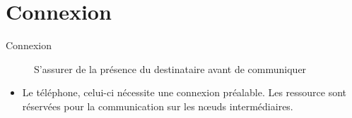 	\section{Connexion}
	\begin{description}
		\item[Connexion] S'assurer de la présence du destinataire avant de communiquer
	\end{description}
	\begin{exemple}
		\begin{itemize}
			\item Le téléphone, celui-ci nécessite une connexion préalable. Les ressource sont réservées pour la communication sur les n\oe{}uds
				intermédiaires.
		\end{itemize}
	\end{exemple}
